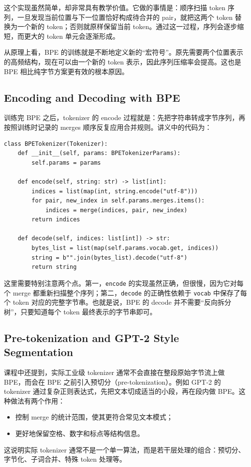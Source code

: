 \documentclass[a4paper,UTF8]{article}
\numberwithin{equation}{section}
\begin{document}
这个实现虽然简单，却非常具有教学价值。它做的事情是：顺序扫描 token 序列，一旦发现当前位置与下一位置恰好构成待合并的 pair，就把这两个 token 替换为一个新的 token；否则就原样保留当前 token。通过这一过程，序列会逐步缩短，而更大的 token 单元会逐渐形成。

从原理上看，BPE 的训练就是不断地定义新的“宏符号”。原先需要两个位置表示的高频结构，现在可以由一个新的 token 表示，因此序列压缩率会提高。这也是 BPE 相比纯字节方案更有效的根本原因。

\subsection{Encoding and Decoding with BPE}

训练完 BPE 之后，tokenizer 的 encode 过程就是：先把字符串转成字节序列，再按照训练时记录的 merges 顺序反复应用合并规则。讲义中的代码为：

\begin{verbatim}
class BPETokenizer(Tokenizer):
    def __init__(self, params: BPETokenizerParams):
        self.params = params

    def encode(self, string: str) -> list[int]:
        indices = list(map(int, string.encode("utf-8")))
        for pair, new_index in self.params.merges.items():
            indices = merge(indices, pair, new_index)
        return indices

    def decode(self, indices: list[int]) -> str:
        bytes_list = list(map(self.params.vocab.get, indices))
        string = b"".join(bytes_list).decode("utf-8")
        return string
\end{verbatim}

这里需要特别注意两个点。第一，\verb|encode| 的实现虽然正确，但很慢，因为它对每个 merge 都重新扫描整个序列；第二，\verb|decode| 的正确性依赖于 \verb|vocab| 中保存了每个 token 对应的完整字节串。也就是说，BPE 的 decode 并不需要“反向拆分树”，只要知道每个 token 最终表示的字节串即可。

\subsection{Pre-tokenization and GPT-2 Style Segmentation}

课程中还提到，实际工业级 tokenizer 通常不会直接在整段原始字节流上做 BPE，而会在 BPE 之前引入预切分（pre-tokenization）。例如 GPT-2 的 tokenizer 通过复杂正则表达式，先把文本切成适当的小段，再在段内做 BPE。这种做法有两个作用：
\begin{itemize}
    \item 控制 merge 的统计范围，使其更符合常见文本模式；
    \item 更好地保留空格、数字和标点等结构信息。
\end{itemize}
这说明实际 tokenizer 通常不是一个单一算法，而是若干层处理的组合：预切分、字节化、子词合并、特殊 token 处理等。
\end{document}
